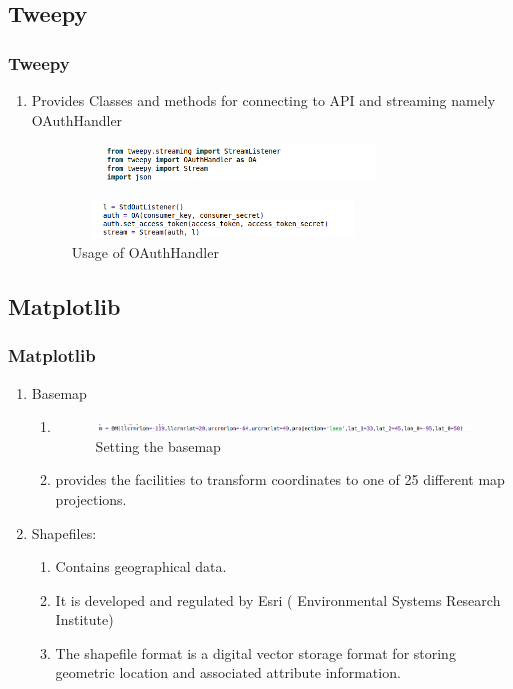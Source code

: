 \documentclass{beamer}
\begin{document}
\subsection{Tweepy}
\begin{frame}
\frametitle{Tweepy}
\begin{enumerate}
\item Provides Classes and methods for connecting to API and streaming namely
OAuthHandler\\
\begin{figure}

\includegraphics[width=9cm,height=1cm]{./Images/Import.png}
\end{figure}

\begin{figure}
\includegraphics[width=8cm,height=1cm]{./Images/OAuth.png}
\caption{Usage of OAuthHandler}
\end{figure}
\end{enumerate}
\end{frame}





\subsection{Matplotlib}


\begin{frame}
\frametitle{Matplotlib}

\begin{enumerate}
\item Basemap
\begin{enumerate}
\item[]
\begin{figure}
\includegraphics[scale=0.3]{./Images/BaseMap}
\caption{Setting the basemap}
\end{figure}

\item provides the facilities to transform coordinates to one of 25 different map projections.
\end{enumerate}

\item Shapefiles:
\begin{enumerate}
\item  Contains geographical data.
\item It is developed and regulated by Esri ( Environmental Systems Research Institute)
\item The shapefile format is a digital vector storage format for storing geometric location and associated attribute information.
\end{enumerate}
\end{enumerate}
\end{frame}
\end{document}
